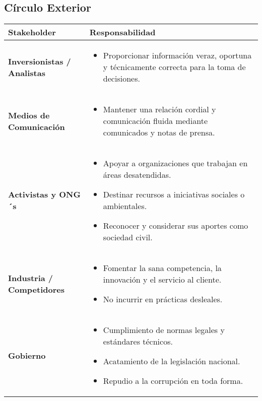 \documentclass[a4paber,12pt]{article}
\begin{document}
	\newpage
	
	\subsection*{Círculo Exterior}
	
	\begin{longtable}{>{\raggedright\arraybackslash}p{4cm} >{\raggedright\arraybackslash}p{11cm}}
		\toprule
		\textbf{Stakeholder} & \textbf{Responsabilidad} \\
		\midrule
		
		\textbf{Inversionistas / Analistas} & 
		\begin{itemize}
			\item Proporcionar información veraz, oportuna y técnicamente correcta para la toma de decisiones.
		\end{itemize} \\
		
		\textbf{Medios de Comunicación} & 
		\begin{itemize}
			\item Mantener una relación cordial y comunicación fluida mediante comunicados y notas de prensa.
		\end{itemize} \\
		
		\textbf{Activistas y ONG´s} & 
		\begin{itemize}
			\item Apoyar a organizaciones que trabajan en áreas desatendidas.
			\item Destinar recursos a iniciativas sociales o ambientales.
			\item Reconocer y considerar sus aportes como sociedad civil.
		\end{itemize} \\
		
		\textbf{Industria / Competidores} & 
		\begin{itemize}
			\item Fomentar la sana competencia, la innovación y el servicio al cliente.
			\item No incurrir en prácticas desleales.
		\end{itemize} \\
		
		\textbf{Gobierno} & 
		\begin{itemize}
			\item Cumplimiento de normas legales y estándares técnicos.
			\item Acatamiento de la legislación nacional.
			\item Repudio a la corrupción en toda forma.
		\end{itemize} \\
		
		\bottomrule
	\end{longtable}
	\newpage
\end{document}
